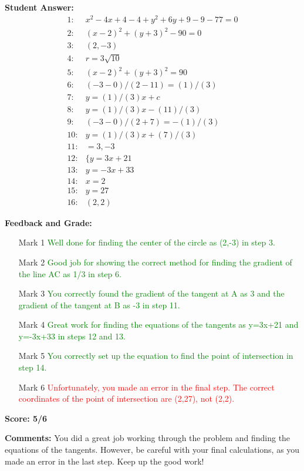 \documentclass{article}
\begin{document}
\textbf{Student Answer:}
\begin{align*}
1: & x^{2}-4x+4-4+y^{2}+6y+9-9-77=0 \\
2: & (x-2)^{2}+(y+3)^{2}-90=0 \\
3: & (2,-3) \\
4: & r=3\sqrt{10} \\
5: & (x-2)^{2}+(y+3)^{2}=90 \\
6: & (-3-0)/(2-11)=(1)/(3) \\
7: & y=(1)/(3)x+c \\
8: & y=(1)/(3)x-(11)/(3) \\
9: & (-3-0)/(2+7)=-(1)/(3) \\
10: & y=(1)/(3)x+(7)/(3) \\
11: & =3,-3 \\
12: & \{y=3x+21 \\
13: & y=-3x+33 \\
14: & x=2 \\
15: & y=27 \\
16: & (2,2)
\end{align*}

\textbf{Feedback and Grade:}
\begin{itemize}
\item[Mark 1] \textcolor{green}{Well done for finding the center of the circle as (2,-3) in step 3.}
\item[Mark 2] \textcolor{green}{Good job for showing the correct method for finding the gradient of the line AC as 1/3 in step 6.}
\item[Mark 3] \textcolor{green}{You correctly found the gradient of the tangent at A as 3 and the gradient of the tangent at B as -3 in step 11.}
\item[Mark 4] \textcolor{green}{Great work for finding the equations of the tangents as y=3x+21 and y=-3x+33 in steps 12 and 13.}
\item[Mark 5] \textcolor{green}{You correctly set up the equation to find the point of intersection in step 14.}
\item[Mark 6] \textcolor{red}{Unfortunately, you made an error in the final step. The correct coordinates of the point of intersection are (2,27), not (2,2).}
\end{itemize}

\textbf{Score: 5/6}

\textbf{Comments:} You did a great job working through the problem and finding the equations of the tangents. However, be careful with your final calculations, as you made an error in the last step. Keep up the good work!
\end{document}
